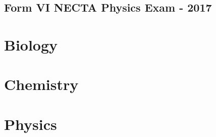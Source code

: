 \documentclass[pdftex,10pt,a4paper,twoside]{report}
\begin{document}
%
%
%

\section{Form VI NECTA Physics Exam - 2017} 


\chapter{Biology}
%


\chapter{Chemistry}



\chapter{Physics}
%


%
\end{document}
